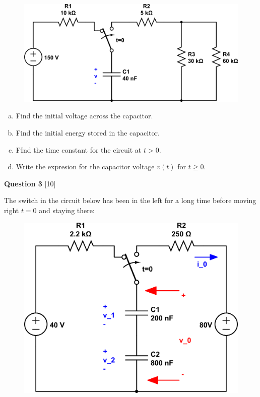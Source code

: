 \documentclass[12pt]{article}
\begin{document}
\begin{figure}[h!]
\begin{center}
 \includegraphics[scale=0.4]{p7_21.png}
\end{center}
\end{figure}

\begin{enumerate}[(a)]
\item Find the initial voltage across the capacitor.
\item Find the initial energy stored in the capacitor.
\item FInd the time constant for the circuit at $t > 0$.
\item Write the expresion for the capacitor voltage $v(t)$ for $t \geq 0$.
\end{enumerate}

\newpage

{\bf Question 3} [10] %

The switch in the circuit below has been in the left for a long time before moving right $t=0$ and staying there:

\begin{figure}[h!]
\begin{center}
 \includegraphics[scale=0.3]{p7_64.png}
\end{center}
\end{figure}
\end{document}
